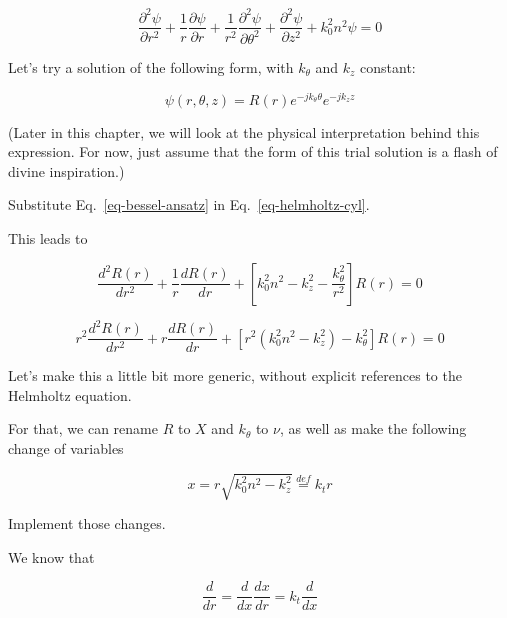 \begin{equation}
\frac{\partial^2 \psi}{\partial r^2} + \frac{1}{r} \frac{\partial \psi}{\partial r} +\frac{1}{r^2} \frac{\partial^2 \psi}{\partial \theta^2} + \frac{\partial^2 \psi}{\partial z^2} + k_0^2 n^2\psi = 0 \label{eq-helmholtz-cyl}
\end{equation}

Let's try a solution of the following form, with $k_\theta$ and $k_z$ constant: 

\begin{equation}
\psi(r,\theta,z) = R(r)e^{-j k_\theta \theta }e^{-j k_z z}
\label{eq-bessel-ansatz}
\end{equation}  

(Later in this chapter, we will look at the physical interpretation behind this expression. For now, just assume that the form of this trial solution is a flash of divine inspiration.)

\begin{cue}
Substitute Eq.~\ref{eq-bessel-ansatz} in Eq.~\ref{eq-helmholtz-cyl}.
\end{cue}

This leads to

\begin{equation}
\frac{d^2 R(r)}{d r^2} + \frac{1}{r} \frac{d R(r)}{d r} + \left[k_0^2 n^2 - k_z^2 - \frac{k_\theta^2}{r^2} \right] R(r) = 0
\end{equation} 


\begin{equation}
r^2\frac{d^2 R(r)}{d r^2} + r \frac{d R(r)}{d r} + \left[ r^2 (k_0^2 n^2 - k_z^2)- k_\theta^2 \right] R(r) = 0
\end{equation}

Let's make this a little bit more generic, without explicit references to the Helmholtz equation.

For that, we can rename $R$ to $X$ and $k_\theta$ to $\nu$, as well as make the following change of variables

\begin{equation}
x = r \sqrt{k_0^2 n^2 - k_z^2} \stackrel{def}{=} k_t r
\end{equation}

\begin{cue}
Implement those changes.
\end{cue}

We know that

\begin{equation}
 \frac{d}{d r} =  \frac{d}{d x} \frac{dx}{dr} = k_t \frac{d}{d x} 
\end{equation}

